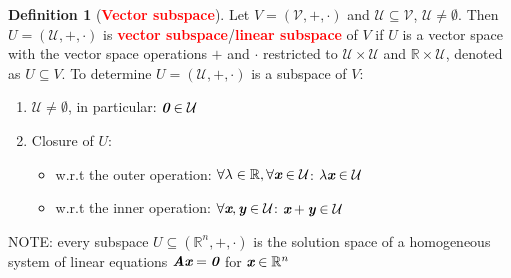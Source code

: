 \documentclass[12pt]{article}
\theoremstyle{definition}
\newtheorem{definition}{Definition}[section]
\newcommand{\keyword}[1]{\textbf{\textcolor{red}{#1}}}
\newcommand{\mat}[1]{\textit{\textbf{#1}}}
\begin{document}
        \newpage
        \begin{definition}[\keyword{Vector subspace}]
            Let $V=(\mathcal{V},+,\cdot)$ and $\mathcal{U}\subseteq\mathcal{V}$, 
            $\mathcal{U}\neq\emptyset$. Then $U=(\mathcal{U},+,\cdot)$ is 
            \keyword{vector subspace}/\keyword{linear subspace} of $V$ if $U$ is
            a vector space with the vector space operations $+$ and $\cdot$ 
            restricted to $\mathcal{U}\times\mathcal{U}$ and 
            $\mathbb{R}\times\mathcal{U}$, denoted as $U\subseteq V$.
            To determine $U=(\mathcal{U}, +, \cdot)$ is a subspace of $V$:
            \begin{enumerate}
                \item $\mathcal{U}\neq\emptyset$, in particular: 
                    $\mat{0}\in\mathcal{U}$
                \item Closure of $U$:
                    \begin{itemize}
                        \item w.r.t the outer operation: $\forall\lambda\in\mathbb{R},\forall\mat{x}\in\mathcal{U}$: $\lambda\mat{x}\in\mathcal{U}$
                        \item w.r.t the inner operation: $\forall\mat{x},\mat{y}\in\mathcal{U}$: $\mat{x}+\mat{y}\in\mathcal{U}$
                    \end{itemize}
            \end{enumerate}
            NOTE: every subspace $U\subseteq(\mathbb{R}^n, +, \cdot)$ is the 
            solution space of a homogeneous system of linear equations 
            $\mat{A}\mat{x}=\mat{0}$ for $\mat{x}\in\mathbb{R}^n$
        \end{definition}
    \newpage
\end{document}
